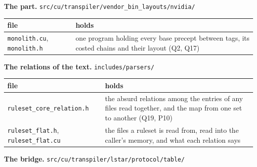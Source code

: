 \textbf{The part.} \texttt{src/\allowbreak{}cu/\allowbreak{}transpiler/\allowbreak{}vendor\_\allowbreak{}bin\_\allowbreak{}layouts/\allowbreak{}nvidia/\allowbreak{}}

{\small
\setlength{\tabcolsep}{6pt}
\begin{longtable}{>{\RaggedRight\arraybackslash}p{}>{\RaggedRight\arraybackslash}p{}}
\toprule
file & holds \\
\midrule
\endhead
\texttt{monolith.\allowbreak{}cu}, \texttt{monolith.\allowbreak{}h} & one program holding every base precept between tags, its costed chains and their layout (Q2, Q17) \\
\bottomrule
\end{longtable}
}

\textbf{The relations of the text.} \texttt{includes/\allowbreak{}parsers/\allowbreak{}}

{\small
\setlength{\tabcolsep}{6pt}
\begin{longtable}{>{\RaggedRight\arraybackslash}p{}>{\RaggedRight\arraybackslash}p{}}
\toprule
file & holds \\
\midrule
\endhead
\texttt{ruleset\_\allowbreak{}core\_\allowbreak{}relation.\allowbreak{}h} & the absurd relations among the entries of any files read together, and the map from one set to another (Q19, P10) \\
\texttt{ruleset\_\allowbreak{}flat.\allowbreak{}h}, \texttt{ruleset\_\allowbreak{}flat.\allowbreak{}cu} & the files a ruleset is read from, read into the caller's memory, and what each relation says \\
\bottomrule
\end{longtable}
}

\textbf{The bridge.} \texttt{src/\allowbreak{}cu/\allowbreak{}transpiler/\allowbreak{}lstar/\allowbreak{}protocol/\allowbreak{}table/\allowbreak{}}


